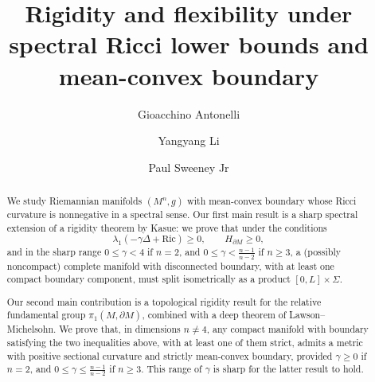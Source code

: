 \documentclass[12pt,a4paper,reqno]{amsart}
\title[Spectral Ricci Bounds and Mean-Convex Boundary]{Rigidity and flexibility under spectral Ricci lower bounds and mean-convex boundary}
\author{Gioacchino Antonelli}
\author{Yangyang Li}
\author{Paul Sweeney Jr}
\theoremstyle{definition}
\renewcommand{\leq}{\leqslant}
\renewcommand{\geq}{\geqslant}
\begin{document}
\begin{abstract}
    We study Riemannian manifolds $(M^n,g)$ with mean-convex boundary whose Ricci curvature is nonnegative in a spectral sense. Our first main result is a sharp spectral extension of a rigidity theorem by Kasue: we prove that under the conditions
\[
\lambda_1(-\gamma\Delta+\mathrm{Ric})\geq 0,\qquad 
H_{\partial M}\geq 0,
\]
and in the sharp range \(0\leq \gamma<4\) if \(n=2\), and \(0\leq\gamma<\frac{n-1}{n-2}\) if \(n\geq3\), a (possibly noncompact) complete manifold with disconnected boundary, with at least one compact boundary component, must split isometrically as a product $[0,L]\times \Sigma$. 

Our second main contribution is a topological rigidity result for the relative
fundamental group $\pi_1(M,\partial M)$, combined with a deep theorem of
Lawson--Michelsohn. We prove that, in dimensions $n\neq4$, any compact
manifold with boundary satisfying the two inequalities above, with at least one
of them strict, admits a metric with positive sectional curvature
and strictly mean-convex boundary, provided $\gamma\geq0$ if $n=2$, and
$0\leq\gamma\leq\frac{n-1}{n-2}$ if $n\geq3$. This range of $\gamma$ is sharp for the latter result to hold.
\end{abstract}
\maketitle
\tableofcontents
\end{document}
